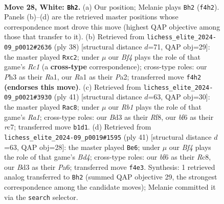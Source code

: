 \documentclass[11pt]{article}
\begin{document}
\clearpage

\begin{figure}[p]\centering
\begin{subfigure}{0.46\textwidth}\centering
\resizebox{\linewidth}{!}{%
\newchessgame
\chessboard[
  setfen={2r3nr/p4k1p/2p2b2/6p1/5B2/3B1P1P/PPP2KP1/RR6 w - - 0 28},
  showmover=false,
  pgfstyle=straightmove, color=movearrow, markmove={f4-h2}
]}
\caption{}
\end{subfigure}\hfill
\begin{subfigure}{0.46\textwidth}\centering
\resizebox{\linewidth}{!}{%
\newchessgame
\chessboard[
  setfen={4k2r/2p1b1pp/p3p3/1p4r1/3B4/2P5/PPp2PPP/R1R3K1 w k - 2 20},
  showmover=false,
  pgfstyle=straightmove, color=movearrow, markmove={c1-c2}
]}
\caption{}
\end{subfigure}
\\[4pt]
\begin{subfigure}{0.46\textwidth}\centering
\resizebox{\linewidth}{!}{%
\newchessgame
\chessboard[
  setfen={r4r2/p1R2pk1/5b1p/3N1pp1/2B5/8/PPP2PbP/2K1R3 b - - 1 21},
  showmover=false,
  pgfstyle=straightmove, color=movearrow, markmove={a8-c8}
]}
\caption{}
\end{subfigure}\hfill
\begin{subfigure}{0.46\textwidth}\centering
\resizebox{\linewidth}{!}{%
\newchessgame
\chessboard[
  setfen={2r4r/1p3kp1/p4p1p/3bb3/P7/2P1N3/1P4PP/R1B1R1K1 b - - 1 21},
  showmover=false,
  pgfstyle=straightmove, color=movearrow, markmove={d5-e6}
]}
\caption{}
\end{subfigure}
\caption{\textbf{Move 28, White: \texttt{Bh2}.} (a) Our position; Melanie plays \texttt{Bh2} (\texttt{f4h2}). Panels (b)--(d) are the retrieved master positions whose correspondence most drove this move (highest QAP objective among those that transfer to it). (b) Retrieved from \texttt{lichess\_elite\_2024-09\_p0012\#2636} (ply 38) [structural distance $d$=71, QAP obj=29]: the master played \texttt{Rxc2}; under $\mu$ our \emph{Bf4} plays the role of that game's \emph{Rc1} (a \textbf{cross-type} correspondence); cross-type roles: our \emph{P}h3 as their \emph{R}a1, our \emph{R}a1 as their \emph{P}a2; transferred move \texttt{f4h2} \textbf{(endorses this move)}. (c) Retrieved from \texttt{lichess\_elite\_2024-09\_p0021\#3930} (ply 41) [structural distance $d$=63, QAP obj=30]: the master played \texttt{Rac8}; under $\mu$ our \emph{Rb1} plays the role of that game's \emph{Ra1}; cross-type roles: our \emph{B}d3 as their \emph{R}f8, our \emph{b}f6 as their \emph{r}c7; transferred move \texttt{b1d1}. (d) Retrieved from \texttt{lichess\_elite\_2024-09\_p0019\#1595} (ply 41) [structural distance $d$=63, QAP obj=28]: the master played \texttt{Be6}; under $\mu$ our \emph{Bf4} plays the role of that game's \emph{Bd4}; cross-type roles: our \emph{b}f6 as their \emph{R}c8, our \emph{B}d3 as their \emph{P}a6; transferred move \texttt{f4e3}. Synthesis: 1 retrieved analog transferred to \texttt{Bh2} (summed QAP objective 29, the strongest correspondence among the candidate moves); Melanie committed it via the \texttt{search} selector.}
\label{fig:thought-m54}
\end{figure}
\end{document}
